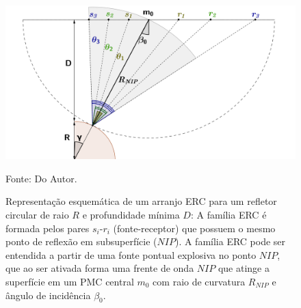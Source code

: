 \begin{figure}[htb]
\caption{Representação esquemática de um arranjo ERC para um refletor circular de raio $R$ e profundidade
mínima $D$: A família ERC é formada pelos pares $s_i$-$r_i$ (fonte-receptor) que possuem o mesmo ponto de
reflexão em subsuperfície ($NIP$). A família ERC pode ser entendida a partir de uma fonte pontual explosiva
no ponto $NIP$, que ao ser ativada forma uma frente de onda $NIP$ que atinge a superfície em um PMC central 
$m_0$ com raio de curvatura $R_{NIP}$ e ângulo de incidência $\beta_0$.}
\begin{center}
\includegraphics[scale=0.4]{images/cre.png}
\vspace{-0.3cm}
\end{center}
\begin{center}
 Fonte: Do Autor.
\end{center}
\label{fig:4.1}
\end{figure}


